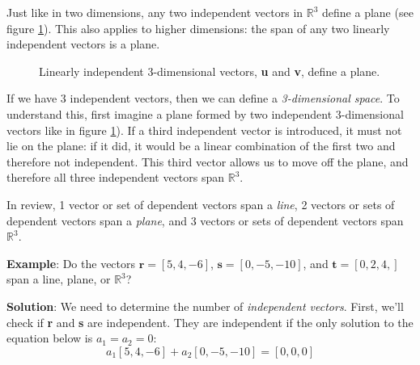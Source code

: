 Just like in two dimensions, any two independent vectors in $\mathbb{R}^3$ 
define a plane (see figure \ref{fig:plane}). This also applies to higher 
dimensions: the span of any two linearly independent vectors is a plane. 

\begin{figure}[htbp]
\centering
{}
\caption{Linearly independent 3-dimensional vectors, \textbf{u} and \textbf{v}, 
define a plane.}
\label{fig:plane}
\end{figure}

If we have 3 independent vectors, then we can define a \textit{3-dimensional 
space}. To understand this, first imagine a plane formed by two independent 
3-dimensional vectors like in figure \ref{fig:plane}). If a third independent 
vector is introduced, it must not lie on the plane: if it did, it would be a 
linear combination of the first two and therefore not independent. This third 
vector allows us to move off the plane, and therefore all three independent 
vectors span $\mathbb{R}^3$. 

In review, 1 vector or set of dependent vectors 
span a \textit{line}, 2 vectors or sets of dependent vectors span a 
\textit{plane}, and 3 vectors or sets of dependent vectors span $\mathbb{R}^3$. 

\textbf{Example}: Do the vectors $\mathbf{r} = \left[ 5, 4, -6 \right]$, 
$\mathbf{s} = \left[ 0, -5, -10 \right]$, and $\mathbf{t} = \left[ 0, 2, 4, 
\right]$ span a line, plane, or $\mathbb{R}^3$?

\textbf{Solution}: We need to determine the number of \textit{independent 
vectors}. First, we'll check if \textbf{r} and \textbf{s} are independent. 
They are independent if the only solution to the equation below is $a_1 = a_2 
= 0$:
$$a_1 \left[5, 4, -6 \right] + a_2 \left[ 0, -5, -10 \right] = \left[ 0, 0, 0 
\right]$$

